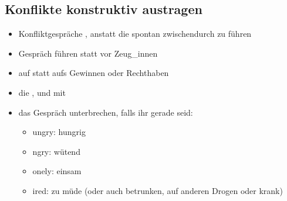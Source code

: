 \subsection{Konflikte konstruktiv austragen}

\begin{itemize}
  \item Konfliktgespräche , anstatt die spontan zwischendurch zu führen
  \item Gespräch  führen statt vor Zeug\_innen
  \item auf  statt aufs Gewinnen oder Rechthaben
  \item die , und mit 
  \item das Gespräch unterbrechen, falls ihr gerade  seid:
    \begin{itemize}
      \item {}ungry: hungrig
      \item {}ngry: wütend
      \item {}onely: einsam
      \item {}ired: zu müde (oder auch betrunken, auf anderen Drogen oder krank)
    \end{itemize}
\end{itemize}
